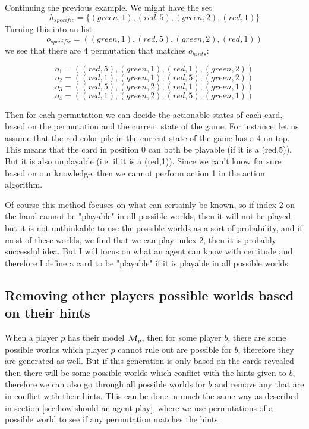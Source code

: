 Continuing the previous example. We might have the set \[h_{specific} = \{(green,1),(red,5),(green,2),(red,1)\}\]
Turning this into an list 
\[o_{specific} = ((green,1),(red,5),(green,2),(red,1))\]
we see that there are 4 permutation that matches $o_{hints}$:

\[o_{1} = ((red,5),(green,1),(red,1),(green,2))\]
\[o_{2} = ((red,1),(green,1),(red,5),(green,2))\]
\[o_{3} = ((red,5),(green,2),(red,1),(green,1))\]
\[o_{4} = ((red,1),(green,2),(red,5),(green,1))\]

Then for each permutation we can decide the actionable states of each card, based on the permutation and the current state of the game. For instance, let us assume that the red color pile in the current state of the game has a 4 on top. This means that the card in position 0 can both be playable (if it is a (red,5)). But it is also unplayable (i.e. if it is a (red,1)). Since we can't know for sure based on our knowledge, then we cannot perform action 1 in the action algorithm.

Of course this method focuses on what can certainly be known, so if index 2 on the hand cannot be "playable" in all possible worlds, then it will not be played, but it is not unthinkable to use the possible worlds as a sort of probability, and if most of these worlds, we find that we can play index 2, then it is probably successful idea. But I will focus on what an agent can know with certitude and therefore I define a card to be "playable" if it is playable in all possible worlds.

\subsection{Removing other players possible worlds based on their hints} \label{sec:design:removing-worlds-based-on-hints}
When a player $p$ has their model $\mathcal{M}_p$, then for some player $b$, there are some possible worlds which player $p$ cannot rule out are possible for $b$, therefore they are generated as well. But if this generation is only based on the cards revealed then there will be some possible worlds which conflict with the hints given to $b$, therefore we can also go through all possible worlds for $b$ and remove any that are in conflict with their hints. This can be done in much the same way as described in section \ref{sec:how-should-an-agent-play}, where we use permutations of a possible world to see if any permutation matches the hints.

